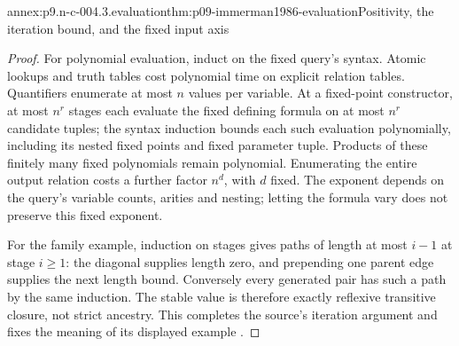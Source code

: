 \begin{annexitem}{annex:p9.n-c-004.3.evaluation}{thm:p09-immerman1986-evaluation}{Positivity, the iteration bound, and the fixed input axis}
\begin{proof}
For polynomial evaluation, induct on the fixed query's syntax.  Atomic
lookups and truth tables cost polynomial time on explicit relation tables.
Quantifiers enumerate at most \(n\) values per variable.  At a
fixed-point constructor, at most \(n^r\) stages each evaluate the
fixed defining formula on at most \(n^r\) candidate tuples; the
syntax induction bounds each such evaluation polynomially, including its
nested fixed points and fixed parameter tuple.  Products of these finitely
many fixed polynomials remain polynomial.  Enumerating the entire output
relation costs a further factor \(n^d\), with \(d\) fixed.
The exponent depends on the query's variable counts, arities and nesting;
letting the formula vary does not preserve this fixed exponent.

For the family example, induction on stages gives paths of length at
most \(i-1\) at stage \(i\geq1\): the diagonal supplies length
zero, and prepending one parent edge supplies the next length bound.
Conversely every generated pair has such a path by the same induction.
The stable value is therefore exactly reflexive transitive closure,
not strict ancestry.  This completes the source's iteration argument
and fixes the meaning of its displayed example \cite[secs.~1--2]{Immerman1986}.
\end{proof}
\end{annexitem}

